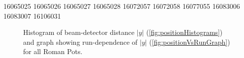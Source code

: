 16065025
16065026
16065027
16065028
16072057
16072058
16077055
16083006
16083007
16106031

\begin{figure}[hb]
\centering
\parbox{0.4\textwidth}{
  \centering
  \begin{subfigure}[b]{\linewidth}{
                }
  \end{subfigure}
}
\quad
\parbox{0.545\textwidth}{
  \centering
  \begin{subfigure}[b]{\linewidth}{
                }
  \end{subfigure}
}%
\caption[Beam-detector distance of the Roman Pots in run 15.]{Histogram of beam-detector distance $|y|$ (\ref{fig:positionHistograms}) and graph showing run-dependence of $|y|$ (\ref{fig:positionVsRunGraph}) for all Roman Pots.}%
\end{figure}
